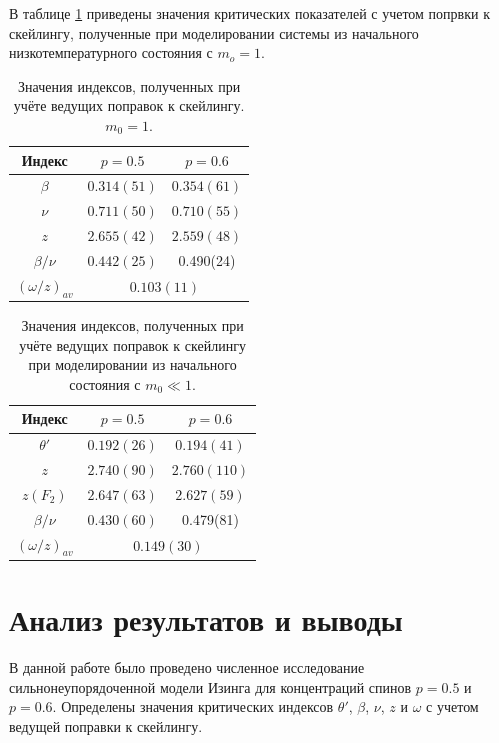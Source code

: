 \documentclass[12pt,a4paper]{article}
\begin{document}
В таблице \ref{tab:m1_scail} приведены значения критических показателей с учетом попрвки к скейлингу, полученные при моделировании системы из начального низкотемпературного состояния с $m_o = 1$.

\begin{table}
\caption{Значения индексов, полученных при учёте ведущих поправок к скейлингу. $m_0 = 1$. \label{tab:m1_scail}}
\begin{center}
\begin{tabular}{c|c|c}
  Индекс             & $p = 0.5$ & $p = 0.6$  \\ \hline
  {$\beta$} & {$0.314(51)$} & {$0.354(61)$} \\
  {$\nu$} & {$0.711(50)$} & {$0.710(55)$} \\
  {$z$} & {$2.655(42)$} & {$2.559(48)$} \\
  {$\beta/\nu$}  & {$0.442(25)$} & 0.490(24) \\
  \hline
  {$(\omega/z)_{av}$}  & \multicolumn{2}{c}{$0.103(11)$}
\end{tabular}
\end{center}
\end{table}

\begin{table}
\caption{Значения индексов, полученных при учёте ведущих поправок к скейлингу при моделировании из начального состояния с $m_0 \ll 1$. }
\label{tab:m0_scail}
\begin{center}
\begin{tabular}{c|c|c}
  Индекс             & $p = 0.5$ & $p = 0.6$  \\ \hline
  {$\theta'$} & {$0.192(26)$} & {$0.194(41)$} \\
  {$z$} & {$2.740(90)$} & {$2.760(110)$} \\
  {$z(F_2)$} & {$2.647(63)$} & {$2.627(59)$} \\
  {$\beta/\nu$}  & {$0.430(60)$} & 0.479(81) \\
  \hline
  {$(\omega/z)_{av}$}  & \multicolumn{2}{c}{$0.149(30)$}
\end{tabular}
\end{center}
\end{table}

\section{Анализ результатов и выводы}
В данной работе было проведено численное исследование сильнонеупорядоченной модели Изинга для концентраций спинов $p = 0.5$ и  $p = 0.6$. Определены значения критических индексов $\theta'$, $\beta$, $\nu$, $z$ и $\omega$ с учетом ведущей поправки к скейлингу.
\end{document}

